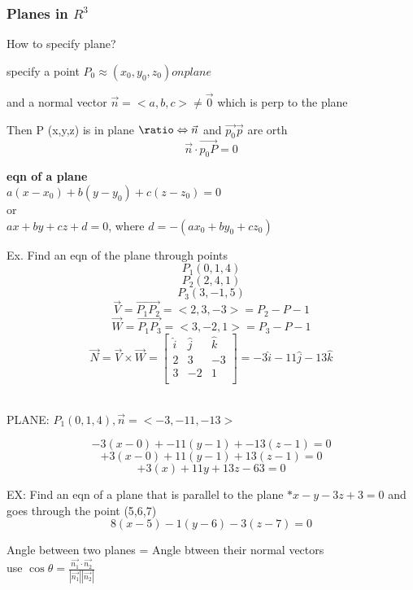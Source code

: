 \documentclass{article}
\newcommand*{\logeq}{\ratio\Leftrightarrow}
\begin{document}
\subsubsection{Planes in $R^3$}
How to specify plane?
\begin{list}{-}{}
\item specify a point $P_0 \approx (x_0, y_0, z_0) on plane$
\item and a normal vector $\vec{n} = <a,b,c> \neq \vec{0}$ which is perp to the plane
\end{list}

Then P (x,y,z) is in plane $\logeq \vec{n} $ and $ \vec{p_0}\vec{p}$ are orth 
\[\vec{n} \cdot \vec{p_0P} = 0\]
\begin{center}
    \textbf{\large eqn of a plane} \\
    $a(x-x_0) + b (y-y_0) + c (z - z_0) = 0$ \\
    or \\
    $ax+by+cz + d =0$, where $d = -(ax_0+by_0+cz_0)$
\end{center}

Ex. Find an eqn of the plane through points 
\[P_1(0,1,4)\]
\[P_2(2,4,1)\]
\[P_3(3,-1,5)\]
\[\vec{V} = \vec{P_1P_2} = <2,3,-3> = P_2 -P-1 \]
\[\vec{W} = \vec{P_1P_3} = <3,-2,1> = P_3 -P-1 \]
\[\vec{N} = \vec{V} \times\vec{W} = 
\begin{bmatrix}
    \hat{i} & \hat{j} & \hat{k} \\
    2 & 3 & -3 \\
    3 & -2 & 1 \\
\end{bmatrix} 
= -3\hat{i}-11\hat{j}-13\hat{k} \] \\

\begin{center}
    PLANE:   $P_1(0,1,4), \vec{n} = <-3,-11,-13>$
\end{center}
\[-3(x-0) + -11 (y-1) + -13 (z - 1) = 0\]
\[+3(x-0) + 11 (y-1) + 13 (z - 1) = 0\]
\[+3(x) + 11y + 13z -63 = 0\]


\begin{center}
    EX: Find an eqn of a plane that is parallel to the plane $*x-y-3z+3=0$ and goes through the point (5,6,7)
    \[8(x-5) - 1(y-6) -3(z-7) = 0\]
\end{center}
\begin{center}
    Angle between two planes = Angle btween their normal vectors \\
    use $\cos\theta =\frac{\vec{n_1}\cdot\vec{n_2}}{|\vec{n_1}||\vec{n_2}|}$
\end{center}
\end{document}

